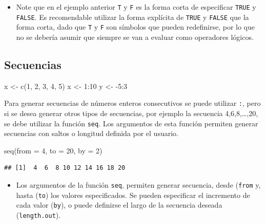 \documentclass[
]{book}
\newenvironment{Shaded}{\begin{snugshade}}{\end{snugshade}}
\newcommand{\AttributeTok}[1]{\textcolor[rgb]{0.77,0.63,0.00}{#1}}
\newcommand{\DecValTok}[1]{\textcolor[rgb]{0.00,0.00,0.81}{#1}}
\newcommand{\FunctionTok}[1]{\textcolor[rgb]{0.00,0.00,0.00}{#1}}
\newcommand{\NormalTok}[1]{#1}
\newcommand{\OtherTok}[1]{\textcolor[rgb]{0.56,0.35,0.01}{#1}}
\newcommand{\SpecialCharTok}[1]{\textcolor[rgb]{0.00,0.00,0.00}{#1}}
\newenvironment{rmdblock}[1]
{\begin{shaded*}
		\begin{itemize}
			\renewcommand{\labelitemi}{
				\raisebox{-.7\height}[0pt][0pt]{
					{\setkeys{Gin}{width=3em,keepaspectratio}\texttt{[image: images/\#1]}}
				}
			}
			\item
		}
		{
		\end{itemize}
	\end{shaded*}
}
\newenvironment{rmdnote}
{\begin{rmdblock}{note}}
	{\end{rmdblock}}
\begin{document}
\begin{rmdnote}
Note que en el ejemplo anterior \texttt{T} y \texttt{F} es la forma
corta de especificar \texttt{TRUE} y \texttt{FALSE}. Es recomendable
utilizar la forma explícita de \texttt{TRUE} y \texttt{FALSE} que la
forma corta, dado que \texttt{T} y \texttt{F} son símbolos que pueden
redefinirse, por lo que no se debería asumir que siempre se van a
evaluar como operadores lógicos.
\end{rmdnote}

\hypertarget{secuencias}{%
\subsection{Secuencias}\label{secuencias}}

\begin{Shaded}
\begin{Highlighting}[]
\NormalTok{x }\OtherTok{\textless{}{-}} \FunctionTok{c}\NormalTok{(}\DecValTok{1}\NormalTok{, }\DecValTok{2}\NormalTok{, }\DecValTok{3}\NormalTok{, }\DecValTok{4}\NormalTok{, }\DecValTok{5}\NormalTok{)}
\NormalTok{x }\OtherTok{\textless{}{-}} \DecValTok{1}\SpecialCharTok{:}\DecValTok{10}
\NormalTok{y }\OtherTok{\textless{}{-}} \SpecialCharTok{{-}}\DecValTok{5}\SpecialCharTok{:}\DecValTok{3}
\end{Highlighting}
\end{Shaded}

Para generar secuencias de números enteros consecutivos se puede utilizar \texttt{:}, pero si se desea generar otros tipos de secuencias, por ejemplo la secuencia 4,6,8,\ldots,20, se debe utilizar la función \texttt{seq}. Los argumentos de esta función permiten generar secuencias con saltos o longitud definida por el usuario.

\begin{Shaded}
\begin{Highlighting}[]
\FunctionTok{seq}\NormalTok{(}\AttributeTok{from =} \DecValTok{4}\NormalTok{, }\AttributeTok{to =} \DecValTok{20}\NormalTok{, }\AttributeTok{by =} \DecValTok{2}\NormalTok{)}
\end{Highlighting}
\end{Shaded}

\begin{verbatim}
## [1]  4  6  8 10 12 14 16 18 20
\end{verbatim}

\begin{rmdnote}
Los argumentos de la función \texttt{seq}, permiten generar secuencia,
desde (\texttt{from} y, hasta (\texttt{to}) los valores especificados.
Se pueden especificar el incremento de cada valor (\texttt{by}), o puede
definirse el largo de la secuencia deseada (\texttt{length.out}).
\end{rmdnote}
\end{document}
